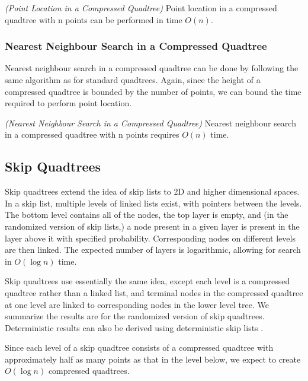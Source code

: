 \documentclass[mcs]{scsthesis}
\begin{document}
\begin{thm} \emph{(Point Location in a Compressed Quadtree)} 
Point location in a compressed quadtree with n points can be performed in
time \(O(n)\). 
\end{thm}

\subsubsection{Nearest Neighbour Search in a Compressed Quadtree}

Nearest neighbour search in a compressed quadtree can be done by following the
same algorithm as for standard quadtrees. Again, since the height of a compressed
quadtree is bounded by the number of points, we can bound the time required to
perform point location.

\begin{thm} \emph{(Nearest Neighbour Search in a Compressed Quadtree)} 
Nearest neighbour search in a compressed quadtree with n points requires
\(O(n)\) time.
\end{thm}

\subsection{Skip Quadtrees}

Skip quadtrees extend the idea of skip lists \cite{skiplist} to 2D and higher
dimensional spaces. In a skip list, multiple levels of linked lists exist, with
pointers between the levels.  The bottom level contains all of the nodes, the
top layer is empty, and (in the randomized version of skip lists,) a node
present in a given layer is present in the layer above it with specified
probability.  Corresponding nodes on different levels are then linked. The
expected number of layers is logarithmic, allowing for search in \(O(\log n)\)
time.

Skip quadtrees use essentially the same idea, except each level is a
compressed quadtree rather than a linked list, and terminal nodes in the
compressed quadtree at one level are linked to corresponding nodes in the
lower level tree.  We summarize the results are for the randomized version of
skip quadtrees.  Deterministic results can also be derived using deterministic
skip lists \cite{skipquadtree}.

Since each level of a skip quadtree consists of a compressed quadtree with
approximately half as many points as that in the level below, we expect to
create \(O(\log n)\) compressed quadtrees.
\end{document}
